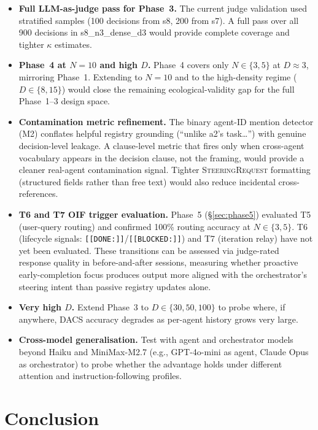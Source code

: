 \documentclass{article}
\begin{document}
\begin{itemize}
  \item \textbf{Full LLM-as-judge pass for Phase~3.} The current judge
  validation used stratified samples (100 decisions from s8, 200 from s7).
  A full pass over all 900 decisions in s8\_n3\_dense\_d3 would provide
  complete coverage and tighter $\kappa$ estimates.
  \item \textbf{Phase~4 at $N=10$ and high $D$.} Phase~4 covers only
  $N{\in}\{3,5\}$ at $D{\approx}3$, mirroring Phase~1.
  Extending to $N=10$ and to the high-density regime ($D{\in}\{8,15\}$)
  would close the remaining ecological-validity gap for the full
  Phase~1--3 design space.
  \item \textbf{Contamination metric refinement.} The binary agent-ID
  mention detector (M2) conflates helpful registry grounding
  (``unlike a2's task\ldots'') with genuine decision-level leakage.
  A clause-level metric that fires only when cross-agent vocabulary
  appears in the decision clause, not the framing, would provide a
  cleaner real-agent contamination signal.
  Tighter \textsc{SteeringRequest} formatting (structured fields rather
  than free text) would also reduce incidental cross-references.
  \item \textbf{T6 and T7 OIF trigger evaluation.}
  Phase~5 (\S\ref{sec:phase5}) evaluated T5 (user-query routing)
  and confirmed 100\% routing accuracy at $N{\in}\{3,5\}$.
  T6 (lifecycle signals: \texttt{[[DONE:]]}/\texttt{[[BLOCKED:]]}) and
  T7 (iteration relay) have not yet been evaluated.
  These transitions can be assessed via judge-rated response quality
  in before-and-after sessions, measuring whether proactive
  early-completion focus produces output more aligned with the
  orchestrator's steering intent than passive registry updates alone.
  \item \textbf{Very high $D$.} Extend Phase~3 to $D \in \{30, 50, 100\}$
  to probe where, if anywhere, DACS accuracy degrades as per-agent
  history grows very large.
  \item \textbf{Cross-model generalisation.} Test with agent and
  orchestrator models beyond Haiku and MiniMax-M2.7 (e.g., GPT-4o-mini
  as agent, Claude Opus as orchestrator) to probe whether the advantage
  holds under different attention and instruction-following profiles.
\end{itemize}

\section{Conclusion}
\label{sec:conclusion}
\end{document}
